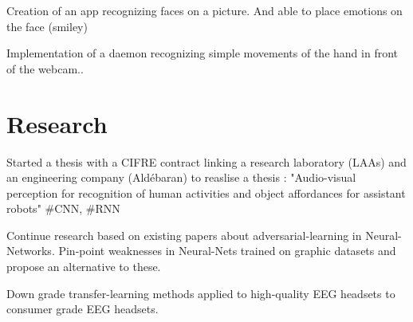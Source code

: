 \documentclass[letterpaper]{deedy-resume} %
\begin{document}
\begin{minipage}[t]{0.66\textwidth}
\sectionspace %



\begin{tightitemize}
\item Creation of an app recognizing faces on a picture. And able to place emotions on the face (smiley)
\item Implementation of a daemon recognizing simple movements of the hand in front of the webcam..
\end{tightitemize}

\sectionspace %


\section{Research}


Started a thesis with a CIFRE contract linking a research laboratory (LAAs) and an engineering company (Aldébaran) to reaslise a thesis : "Audio-visual perception for recognition of human activities and object affordances for assistant robots" \#CNN, \#RNN

\sectionspace %


Continue research based on existing papers about adversarial-learning in Neural-Networks. Pin-point weaknesses in Neural-Nets trained on graphic datasets and propose an alternative to these.

\sectionspace %



Down grade transfer-learning methods applied to high-quality EEG headsets to consumer grade EEG headsets.


\end{minipage}
\end{document}
